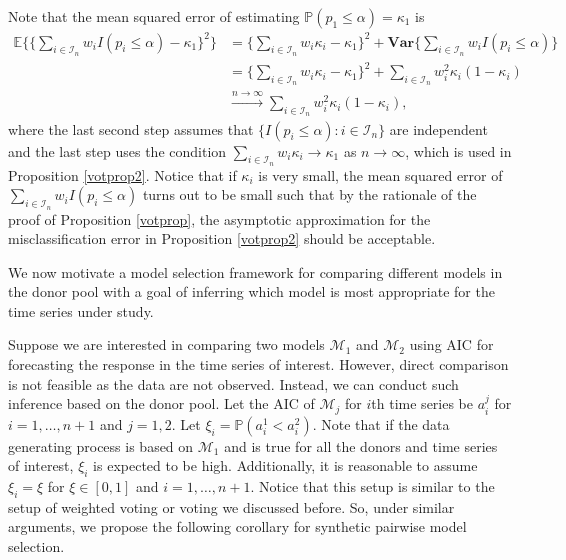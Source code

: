 \documentclass[11pt]{article}
\def\mc#1{\mathcal{#1}} %
\def\E{\mathbb{E}} %
\def\mc#1{\mathcal{#1}}
\def\var#1{\mathrm{Var}(#1)} %
\def\P{\mathbb{P}}
\def\var{\mathbf{Var}}
\theoremstyle{definition}
\begin{document}
Note that the mean squared error of estimating $\P(p_1\leq \alpha)=\kappa_1$ is
\begin{align*}
	\E\bigg\{ \Big\{ \sum_{i\in \mc{I}_n} w_i I(p_i\leq \alpha)-\kappa_1 \Big\}^2 \bigg\}
	&= \Big\{ \sum_{i\in \mc{I}_n} w_i \kappa_i -\kappa_1 \Big\}^2 + \var 
	\Big\{\sum_{i\in \mc{I}_n} w_i I(p_i\leq \alpha) \Big\}\\
	&= \Big\{ \sum_{i\in \mc{I}_n} w_i \kappa_i -\kappa_1 \Big\}^2  + \sum_{i\in \mc{I}_n} w_i^2 \kappa_i (1-\kappa_i) \\
	& \overset{n\to \infty }{\to} \sum_{i\in \mc{I}_n} w_i^2 \kappa_i (1-\kappa_i) ,
\end{align*}
where the last second step assumes that $\{I(p_i\leq \alpha)\colon i\in \mc{I}_n\}$ are independent and the last step uses the condition $\sum_{i\in \mc{I}_n} w_i \kappa_i \to \kappa_1$ as $n\to \infty$, which is used in Proposition \ref{votprop2}. Notice that if $\kappa_i$ is very small, the mean squared error of $\sum_{i\in \mc{I}_n} w_i I(p_i\leq \alpha)$ turns out to be small such that by the rationale of the proof of Proposition \ref{votprop}, the asymptotic approximation for the misclassification error in  Proposition \ref{votprop2} should be acceptable. 



We now motivate a model selection framework for comparing different models in the donor pool with a goal of inferring which model is most appropriate for the time series under study.

Suppose we are interested in comparing two models $\mc{M}_1$ and $\mc{M}_2$ using AIC for forecasting the response in the time series of interest. However, direct comparison is not feasible as the data are not observed. Instead, we can conduct such inference based on the donor pool. Let the AIC of $\mc{M}_j$ for $i$th time series be $a_i^j$ for $i = 1, \ldots, n+1$ and $j = 1, 2$. Let $\xi_i = \P(a_i^1 < a_i^2)$. Note that if the data generating process is based on $\mc{M}_1$ and is true for all the donors and time series of interest, $\xi_i$ is expected to be high. Additionally, it is reasonable to assume $\xi_i =\xi $ for $\xi \in [0,1]$ and $i = 1, \ldots, n+1$.  Notice that this setup is similar to the setup of weighted voting or voting we discussed before. So, under similar arguments, we propose the following corollary for synthetic pairwise model selection.
\end{document}
